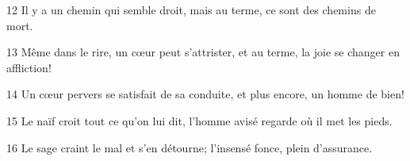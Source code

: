 
12 Il y a un chemin qui semble droit, mais au terme, ce sont des chemins de mort.

13 Même dans le rire, un cœur peut s’attrister, et au terme, la joie se changer en affliction!

14 Un cœur pervers se satisfait de sa conduite, et plus encore, un homme de bien!

15 Le naïf croit tout ce qu’on lui dit, l’homme avisé regarde où il met les pieds.

16 Le sage craint le mal et s’en détourne; l’insensé fonce, plein d’assurance.